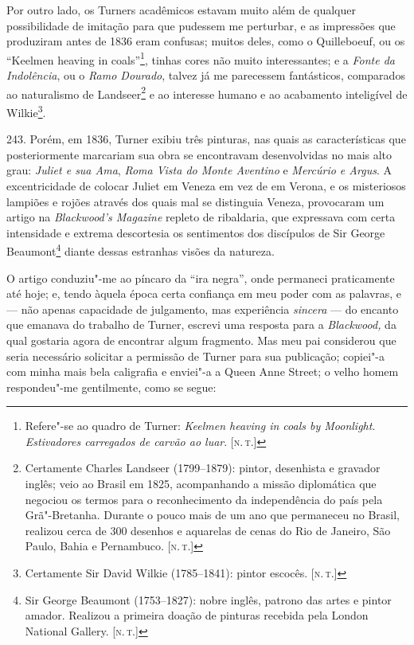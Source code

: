 Por outro lado, os Turners acadêmicos estavam muito além de qualquer
possibilidade de imitação para que pudessem me perturbar, e as
impressões que produziram antes de 1836 eram confusas; muitos deles,
como o Quilleboeuf, ou os ``Keelmen heaving in coals''\footnote{Refere"-se
  ao quadro de Turner: \emph{Keelmen heaving in coals by Moonlight}.
  \emph{Estivadores carregados de carvão ao luar}. {[}\textsc{n.\,t.}{]}},
tinhas cores não muito interessantes; e a \emph{Fonte da Indolência}, ou
o \emph{Ramo Dourado}, talvez já me parecessem fantásticos, comparados
ao naturalismo de Landseer\footnote{Certamente Charles Landseer
  (1799--1879): pintor, desenhista e gravador inglês; veio ao Brasil em
  1825, acompanhando a missão diplomática que negociou os termos para o
  reconhecimento da independência do país pela Grã"-Bretanha. Durante o
  pouco mais de um ano que permaneceu no Brasil, realizou cerca de 300
  desenhos e aquarelas de cenas do Rio de Janeiro, São Paulo, Bahia e
  Pernambuco. {[}\textsc{n.\,t.}{]}} e ao interesse humano e ao acabamento
inteligível de Wilkie\footnote{Certamente Sir David Wilkie (1785--1841):
  pintor escocês. {[}\textsc{n.\,t.}{]}}.

243. Porém, em 1836, Turner exibiu três pinturas, nas quais as
características que posteriormente marcariam sua obra se encontravam
desenvolvidas no mais alto grau: \emph{Juliet e sua Ama}, \emph{Roma
Vista do Monte Aventino} e \emph{Mercúrio e Argus}. A excentricidade de
colocar Juliet em Veneza em vez de em Verona, e os misteriosos lampiões
e rojões através dos quais mal se distinguia Veneza, provocaram um
artigo na \emph{Blackwood's Magazine} repleto de ribaldaria, que
expressava com certa intensidade e extrema descortesia os sentimentos
dos discípulos de Sir George Beaumont\footnote{Sir George Beaumont
  (1753--1827): nobre inglês, patrono das artes e pintor amador. Realizou
  a primeira doação de pinturas recebida pela London National Gallery.
  {[}\textsc{n.\,t.}{]}} diante dessas estranhas visões da natureza.

O artigo conduziu"-me ao píncaro da ``ira negra'', onde permaneci
praticamente até hoje; e, tendo àquela época certa confiança em meu
poder com as palavras, e --- não apenas capacidade de julgamento, mas
experiência \emph{sincera} --- do encanto que emanava do trabalho de
Turner, escrevi uma resposta para a \emph{Blackwood,} da qual gostaria
agora de encontrar algum fragmento. Mas meu pai considerou que seria
necessário solicitar a permissão de Turner para sua publicação; copiei"-a
com minha mais bela caligrafia e enviei"-a a Queen Anne Street; o velho
homem respondeu"-me gentilmente, como se segue: %



